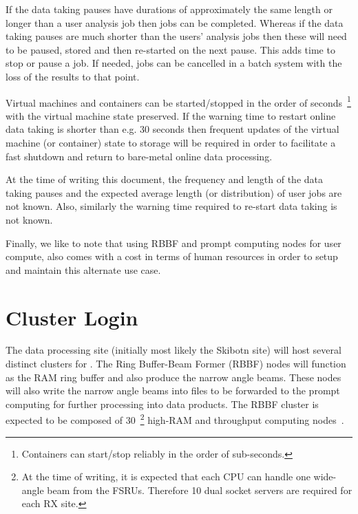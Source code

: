 \documentclass[12pt,a4paper]{article}
\begin{document}
If the data taking pauses have durations of approximately the same length or longer than a user analysis job then jobs can be completed. 
Whereas if the data taking pauses are much shorter than the users' analysis jobs then these will need to be paused, stored and then re-started on the next pause.
This adds time to stop or pause a job.
If needed, jobs can be cancelled in a batch system with the loss of the results to that point.

Virtual machines and containers can be started/stopped in the order of seconds~\footnote{Containers can start/stop reliably in the order of sub-seconds.} with the virtual machine state preserved.
If the warning time to restart online data taking is shorter than e.g. 30 seconds then frequent updates of the virtual machine (or container) state to storage will be required in order to facilitate a fast shutdown and return to bare-metal online data processing.

At the time of writing this document, the frequency and length of the data taking pauses and the expected average length (or distribution) of user jobs are not known.
Also, similarly the warning time required to re-start data taking is not known.

Finally, we like to note that using RBBF and prompt computing nodes for user compute, also comes with a cost in terms of human resources in order to setup and maintain this alternate use case.  

\section{Cluster Login}
\label{sec:cluster}

The data processing site (initially most likely the Skibotn site) will host several distinct clusters for \ED.
The Ring Buffer-Beam Former (RBBF) nodes will function as the RAM ring buffer and also produce the narrow angle beams.
These nodes will also write the narrow angle beams into files to be forwarded to the prompt computing for further processing into data products.
The RBBF cluster is expected to be composed of $30$~\footnote{At the time of writing, it is expected that each CPU can handle one wide-angle beam from the FSRUs. Therefore 10 dual socket servers are required for each RX site.} high-RAM and throughput computing nodes~\cite{amd-epyc}.
\end{document}
